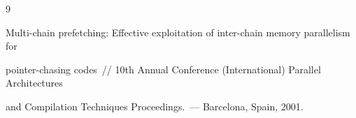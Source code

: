 {{\begin{thebibliography}{9}
\label{end\stat}





Multi-chain prefetching: Effective exploitation of inter-chain memory parallelism for 

pointer-chasing codes~/\!\!/ 10th Annual  Conference (International) Parallel Architectures 

and Compilation Techniques Proceedings.~--- Barcelona, Spain, 2001.

 \end{thebibliography}

}

}    

